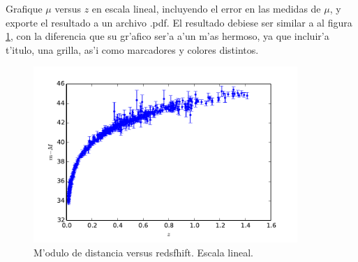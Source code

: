 \documentclass[11pt]{exam}
\begin{document}
\begin{parts}
\item Grafique $\mu$ versus $z$ en escala lineal, incluyendo el error en las medidas de $\mu$, y exporte el resultado a un archivo .pdf. El resultado debiese ser similar a al figura \ref{3}, con la diferencia que su gr'afico ser'a a'un m'as hermoso, ya que incluir'a t'itulo, una grilla, as'i como marcadores y colores distintos.
\begin{figure}[ht]
\centerline{\includegraphics[width=10cm]{figs/m-M-versus-z-con-error.pdf}}
 \caption{M'odulo de distancia versus redsfhift. Escala lineal.}
\label{3}
\end{figure}


\end{parts}
\end{document}
